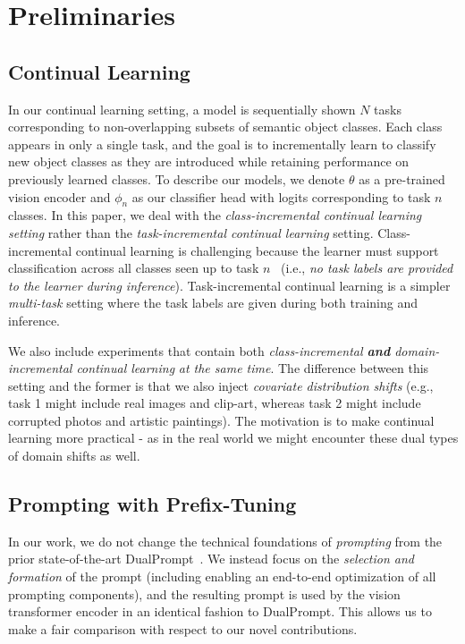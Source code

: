 \section{Preliminaries}
\label{sec:prelim}

\subsection{Continual Learning}
In our continual learning setting, a model is sequentially shown $N$ tasks corresponding to non-overlapping subsets of semantic object classes. Each class appears in only a single task, and the goal is to incrementally learn to classify new object classes as they are introduced while retaining performance on previously learned classes. To describe our models, we denote $\theta$ as a pre-trained vision encoder and $\phi_{n}$ as our classifier head with logits corresponding to task $n$ classes. In this paper, we deal with the \textit{class-incremental continual learning setting} rather than the \textit{task-incremental continual learning} setting. Class-incremental continual learning is challenging because the learner must support classification across all classes seen up to task $n$~\cite{hsu2018re} (i.e., \textit{no task labels are provided to the learner during inference}). Task-incremental continual learning is a simpler \textit{multi-task} setting where the task labels are given during both training and inference.

We also include experiments that contain both \textit{class-incremental \textbf{and} domain-incremental continual learning} \textit{at the same time}. The difference between this setting and the former is that we also inject \emph{covariate distribution shifts} (e.g., task 1 might include real images and clip-art, whereas task 2 might include corrupted photos and artistic paintings). The motivation is to make  continual learning more practical - as in the real world we might encounter these dual types of domain shifts as well.

\subsection{Prompting with Prefix-Tuning}
\label{sec:prelim_b}

In our work, we do not change the technical foundations of \emph{prompting} from the prior state-of-the-art DualPrompt~\cite{wang2022dualprompt}. We instead focus on the \emph{selection and formation} of the prompt (including enabling an end-to-end optimization of all prompting components), and the resulting prompt is used by the vision transformer encoder in an identical fashion to DualPrompt. This allows us to make a fair comparison with respect to our novel contributions.

